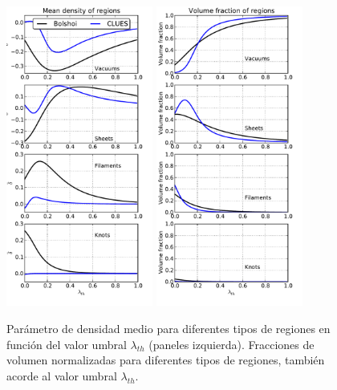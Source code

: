 \newpage
\begin{figure}[htbp]
	\centering
	\includegraphics[width=0.43\textwidth]
	{./figures/4_results/Density_Regions.pdf}
	\includegraphics[width=0.43\textwidth]
	{./figures/4_results/Volume_Regions.pdf}
	
	\caption{\small{Parámetro de densidad medio para diferentes tipos
	de regiones en función del valor umbral $\lambda_{th}$ (paneles 
	izquierda). Fracciones de volumen normalizadas para diferentes tipos
	de regiones, también acorde al valor umbral $\lambda_{th}$.}}
	\label{fig:Vol_Fraction}
\end{figure}


